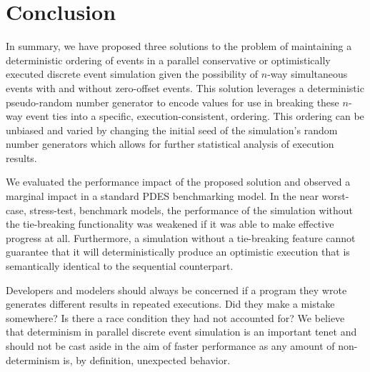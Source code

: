 \documentclass[nonacm,sigconf]{acmart}
\begin{document}
\section{Conclusion}
In summary, we have proposed three solutions to the problem of maintaining a deterministic ordering of events in a parallel conservative or optimistically executed discrete event simulation given the possibility of $n$-way simultaneous events with and without zero-offset events. This solution leverages a deterministic pseudo-random number generator to encode values for use in breaking these $n$-way event ties into a specific, execution-consistent, ordering. This ordering can be unbiased and varied by changing the initial seed of the simulation's random number generators which allows for further statistical analysis of execution results.

We evaluated the performance impact of the proposed solution and observed a marginal impact in a standard PDES benchmarking model. In the near worst-case, stress-test, benchmark models, the performance of the simulation without the tie-breaking functionality was weakened if it was able to make effective progress at all. Furthermore, a simulation without a tie-breaking feature cannot guarantee  that it will deterministically produce an optimistic execution that is semantically identical to the sequential counterpart.

Developers and modelers should always be concerned if a program they wrote generates different results in repeated executions. Did they make a mistake somewhere? Is there a race condition they had not accounted for? We believe that determinism in parallel discrete event simulation is an important tenet and should not be cast aside in the aim of faster performance as any amount of non-determinism is, by definition, unexpected behavior.

\balance

%


\end{document}
